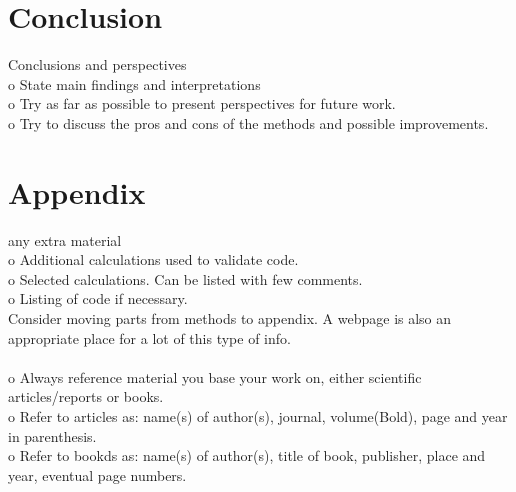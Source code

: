 \documentclass[ 12pt, a4paper ]{article}
\begin{document}
\section{Conclusion}
    Conclusions and perspectives\\
    o   State main findings and interpretations \\
    o   Try as far as possible to present perspectives for future work. \\
    o   Try to discuss the pros and cons of the methods and possible improvements. \\
\section{Appendix}
    any extra material \\
    o   Additional calculations used to validate code. \\
    o   Selected calculations. Can be listed with few comments. \\
    o   Listing of code if necessary. \\
    Consider moving parts from methods to appendix. A webpage is also an appropriate place
    for a lot of this type of info. \\\\

    o   Always reference material you base your work on, either scientific articles/reports
        or books. \\
    o   Refer to articles as: name(s) of author(s), journal, volume(Bold), page and year in
        parenthesis. \\
    o   Refer to bookds as: name(s) of author(s), title of book, publisher, place and year, 
        eventual page numbers. \\
\end{document}
